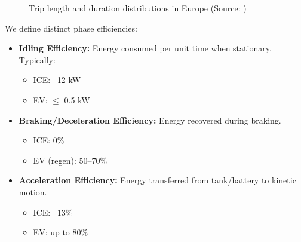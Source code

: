 \begin{figure}[h!]
    \centering
    \hfill
    \caption{Trip length and duration distributions in Europe (Source: \cite{donati_individual_2015})}
    \label{fig:trips-comparison}
\end{figure}

We define distinct phase efficiencies:

\begin{itemize}
    \item \textbf{Idling Efficiency:} Energy consumed per unit time when stationary. Typically:
    \begin{itemize}
        \item ICE: ~12 kW
        \item EV: $\leq$ 0.5 kW
    \end{itemize}

    \item \textbf{Braking/Deceleration Efficiency:} Energy recovered during braking.
    \begin{itemize}
        \item ICE: 0\%
        \item EV (regen): 50–70\% \cite{noauthor_regenerative_nodate}
    \end{itemize}

    \item \textbf{Acceleration Efficiency:} Energy transferred from tank/battery to kinetic motion.
    \begin{itemize}
        \item ICE: ~13\%
        \item EV: up to 80\% \cite{lohse-busch_ambient_2013}
    \end{itemize}
\end{itemize}

